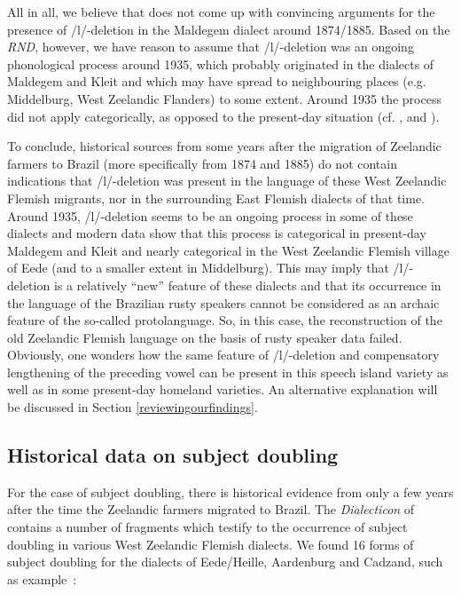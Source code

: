 \documentclass[output=paper,hidelinks,draftmode]{langscibook}
\begin{document}
All in all, we believe that \citet{Versieck1989} does not come up with convincing arguments for the presence of /l/-deletion in the Maldegem dialect around 1874/1885. Based on the \textit{RND}, however, we have reason to assume that /l/-deletion was an ongoing phonological process around 1935, which probably originated in the dialects of Maldegem and Kleit and which may have spread to neighbouring places (e.g. Middelburg, West Zeelandic Flanders) to some extent. Around 1935 the process did not apply categorically, as opposed to the present-day situation (cf. \citealt{Taeldeman1966, DeSchutterJong2005}, and \citealt{Rys2007}).

To conclude, historical sources from some years after the migration of Zeelandic farmers to Brazil (more specifically from 1874 and 1885) do not contain indications that /l/-deletion was present in the language of these West Zeelan\-dic Flemish migrants, nor in the surrounding East Flemish dialects of that time. Around 1935, /l/-deletion seems to be an ongoing process in some of these dialects and modern data show that this process is categorical in present-day Maldegem and Kleit and nearly categorical in the West Zeelandic Flemish village of Eede (and to a smaller extent in Middelburg). This may imply that /l/-deletion is a relatively ``new'' feature of these dialects and that its occurrence in the language of the Brazilian rusty speakers cannot be considered as an archaic feature of the so-called protolanguage. So, in this case, the reconstruction of the old Zeelandic Flemish language on the basis of rusty speaker data failed. Obviously, one wonders how the same feature of /l/-deletion and compensatory lengthening of the preceding vowel can be present in this speech island variety as well as in some present-day homeland varieties. An alternative explanation will be discussed in Section \ref{reviewingourfindings}.

\subsection{Historical data on subject doubling} 

For the case of subject doubling, there is historical evidence from only a few years after the time the Zeelandic farmers migrated to Brazil. The \textit{Dialecticon} of \citet{Winkler1874} contains a number of fragments which testify to the occurrence of subject doubling in various West Zeelandic Flemish dialects. We found 16 forms of subject doubling for the dialects of Eede/Heille, Aardenburg and Cadzand, such as example~:
\end{document}
